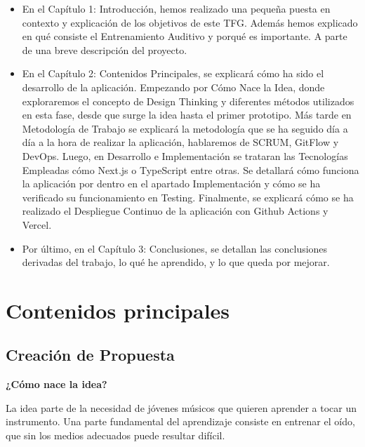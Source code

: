 \documentclass[12pt,twoside,titlepage]{report}
\newcommand\blankpage{%
    \newpage
    \null
    \thispagestyle{empty}%
    \newpage}
\begin{document}
\begin{itemize}

    \item En el Capítulo 1: Introducción, hemos realizado una pequeña puesta en contexto y explicación de los objetivos de este TFG. Además hemos explicado en qué consiste el Entrenamiento Auditivo y porqué es importante. A parte de una breve descripción del proyecto.
    \item En el Capítulo 2: Contenidos Principales, se explicará cómo ha sido el desarrollo de la aplicación. Empezando por Cómo Nace la Idea, donde exploraremos el concepto de Design Thinking y diferentes métodos utilizados en esta fase, desde que surge la idea hasta el primer prototipo. Más tarde en Metodología de Trabajo se explicará la metodología que se ha seguido día a día a la hora de realizar la aplicación, hablaremos de SCRUM, GitFlow y DevOps. Luego, en Desarrollo e Implementación se trataran las Tecnologías Empleadas cómo Next.js o TypeScript entre otras. Se detallará cómo funciona la aplicación por dentro en el apartado Implementación y cómo se ha verificado su funcionamiento en Testing. Finalmente, se explicará cómo se ha realizado el Despliegue Continuo de la aplicación con Github Actions y Vercel.
    \item Por último, en el Capítulo 3: Conclusiones, se detallan las conclusiones derivadas del trabajo, lo qué he aprendido, y lo que queda por mejorar.

\end{itemize}



\chapter{Contenidos principales}
\label{chap:contenidos}

\section{Creación de Propuesta}

\textbf{¿Cómo nace la idea?}

La idea parte de la necesidad de jóvenes músicos que quieren aprender a tocar un instrumento. Una parte fundamental del aprendizaje consiste en entrenar el oído, que sin los medios adecuados puede resultar difícil.
\end{document}
